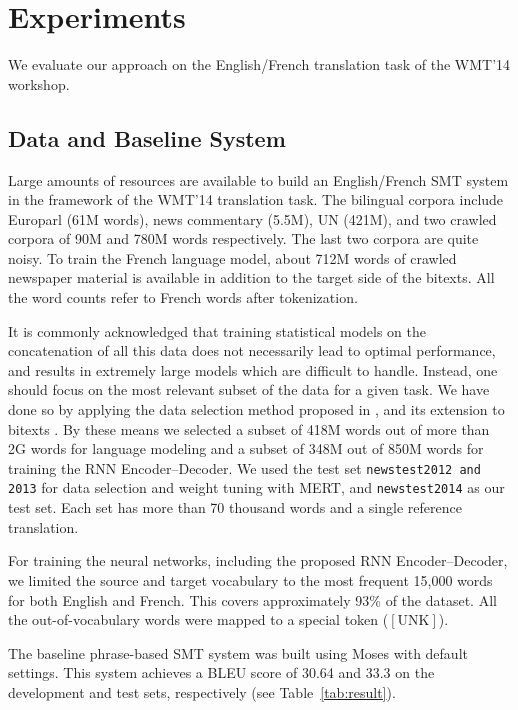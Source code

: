 \section{Experiments}

We evaluate our approach on the English/French translation task of the
WMT'14 workshop.

\subsection{Data and Baseline System}

Large amounts of resources are available to build an English/French SMT system
in the framework of the WMT'14 translation task.  The bilingual corpora include
Europarl (61M words), news commentary (5.5M), UN (421M), and two crawled
corpora of 90M and 780M words respectively.  The last two corpora are quite
noisy. To train the French language model, about 712M words of crawled
newspaper material is available in addition to the target side of the bitexts.
All the word counts refer to French words after tokenization.

It is commonly acknowledged that training statistical models on the concatenation
of all this data does not necessarily lead to optimal performance, and results 
in extremely large models which are difficult to handle.  Instead, one should
focus on the most relevant subset of the data for a given task.  We have done
so by applying the data selection method proposed in \mbox{\cite{Moore2010}}, and its extension to
bitexts \mbox{\cite{Axelrod2011}}. By these means we selected a subset of 418M words
out of more than 2G words for language modeling
and a subset of 348M out of 850M words for training the RNN Encoder--Decoder.  We
used the test set \texttt{newstest2012 and 2013} for data selection and weight
tuning with MERT, and \texttt{newstest2014} as our test set. Each set has more than 70
thousand words and a single reference translation.

For training the neural networks, including the proposed RNN Encoder--Decoder,
we limited the source and target vocabulary to the most frequent 15,000 words
for both English and French. This covers approximately 93\% of the dataset. All
the out-of-vocabulary words were mapped to a special token ($\left[ \text{UNK}
\right]$).

The baseline phrase-based SMT system was built using Moses with default
settings.  This system achieves a BLEU score of 30.64 and 33.3 on the
development and test sets, respectively (see Table~\mbox{\ref{tab:result}}).


